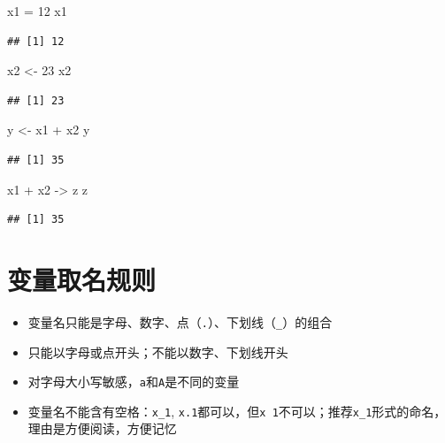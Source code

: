 \documentclass[
]{book}
\newenvironment{Shaded}{\begin{snugshade}}{\end{snugshade}}
\newcommand{\DecValTok}[1]{\textcolor[rgb]{0.00,0.00,0.81}{#1}}
\newcommand{\NormalTok}[1]{#1}
\newcommand{\OtherTok}[1]{\textcolor[rgb]{0.56,0.35,0.01}{#1}}
\newcommand{\SpecialCharTok}[1]{\textcolor[rgb]{0.00,0.00,0.00}{#1}}
\begin{document}
\begin{Shaded}
\begin{Highlighting}[]
\NormalTok{x1 }\OtherTok{=} \DecValTok{12}
\NormalTok{x1}
\end{Highlighting}
\end{Shaded}

\begin{verbatim}
## [1] 12
\end{verbatim}

\begin{Shaded}
\begin{Highlighting}[]
\NormalTok{x2 }\OtherTok{\textless{}{-}} \DecValTok{23}
\NormalTok{x2}
\end{Highlighting}
\end{Shaded}

\begin{verbatim}
## [1] 23
\end{verbatim}

\begin{Shaded}
\begin{Highlighting}[]
\NormalTok{y }\OtherTok{\textless{}{-}}\NormalTok{ x1 }\SpecialCharTok{+}\NormalTok{ x2}
\NormalTok{y}
\end{Highlighting}
\end{Shaded}

\begin{verbatim}
## [1] 35
\end{verbatim}

\begin{Shaded}
\begin{Highlighting}[]
\NormalTok{x1 }\SpecialCharTok{+}\NormalTok{ x2 }\OtherTok{{-}\textgreater{}}\NormalTok{ z }
\NormalTok{z}
\end{Highlighting}
\end{Shaded}

\begin{verbatim}
## [1] 35
\end{verbatim}

\hypertarget{ux53d8ux91cfux53d6ux540dux89c4ux5219}{%
\section{变量取名规则}\label{ux53d8ux91cfux53d6ux540dux89c4ux5219}}

\begin{itemize}
\item
  变量名只能是字母、数字、点（\texttt{.}）、下划线（\texttt{\_}）的组合
\item
  只能以字母或点开头；不能以数字、下划线开头
\item
  对字母大小写敏感，\texttt{a}和\texttt{A}是不同的变量
\item
  变量名不能含有空格：\texttt{x\_1}, \texttt{x.1}都可以，但\texttt{x\ 1}不可以；推荐\texttt{x\_1}形式的命名，理由是方便阅读，方便记忆
\end{itemize}
\end{document}
